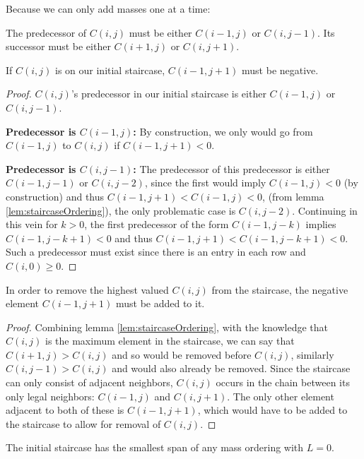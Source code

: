 \documentclass[11pt,twocolumn]{article}
\begin{document}
Because we can only add masses one at a time:

\begin{lem} \label{lem:staircaseNeighborRestriction}
The predecessor of $C(i,j)$ must be either $C(i-1,j)$ or $C(i,j-1)$.  Its successor must be either $C(i+1,j)$ or $C(i,j+1)$.
\end{lem}

\begin{lem}
If $C(i,j)$ is on our initial staircase, $C(i-1,j+1)$ must be negative.
\end{lem}

\begin{proof}
$C(i,j)$'s predecessor in our initial staircase is either $C(i-1,j)$ or $C(i,j-1)$.  

\textbf{Predecessor is $C(i-1,j)$:} By construction, we only would go from $C(i-1,j)$ to $C(i,j)$ if $C(i-1,j+1) < 0$.

\textbf{Predecessor is $C(i,j-1)$:} The predecessor of this predecessor is either $C(i-1,j-1)$ or $C(i,j-2)$, since the first would imply $C(i-1,j) < 0$ (by construction) and thus $C(i-1,j+1) < C(i-1,j) < 0$, (from lemma \ref{lem:staircaseOrdering}), the only problematic case is $C(i,j-2)$.  Continuing in this vein for $k>0$, the first predecessor of the form $C(i-1,j-k)$ implies $C(i-1,j-k+1) < 0$ and thus $C(i-1,j+1) < C(i-1,j-k+1) < 0$. Such a predecessor must exist since there is an entry in each row and $C(i,0) \geq 0$.
\end{proof}

\begin{lem} \label{lem:staircaseDiagonal}
In order to remove the highest valued $C(i,j)$ from the staircase, the negative element $C(i-1,j+1)$ must be added to it.
\end{lem}

\begin{proof}
Combining lemma \ref{lem:staircaseOrdering}, with the knowledge that $C(i,j)$ is the maximum element in the staircase, we can say that $C(i+1,j) > C(i,j)$ and so would be removed before $C(i,j)$, similarly $C(i,j-1) > C(i,j)$ and would also already be removed.  Since the staircase can only consist of adjacent neighbors, $C(i,j)$ occurs in the chain between its only legal neighbors: $C(i-1,j)$ and $C(i,j+1)$.  The only other element adjacent to both of these is $C(i-1,j+1)$, which would have to be added to the staircase to allow for removal of $C(i,j)$.
\end{proof}

\begin{lem} \label{lem:initialStaircaseBest}
The initial staircase has the smallest span of any mass ordering with $L = 0$.
\end{lem}
\end{document}
